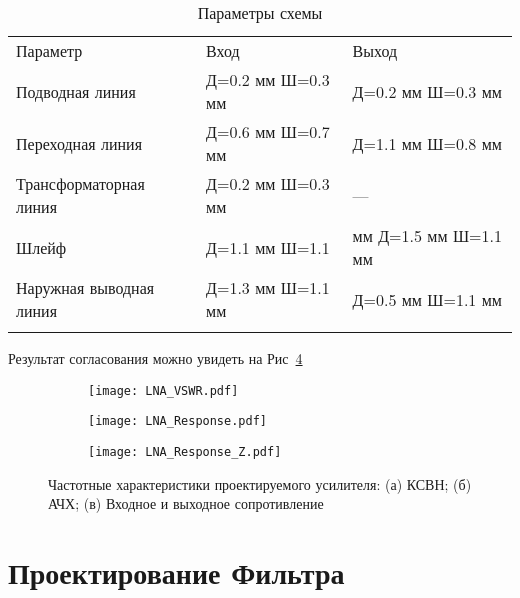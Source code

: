 \begin{table}[!ht]
	\renewcommand{\arraystretch}{2}
	\begin{center}
		\caption{Параметры схемы}\label{tab:LNA-Sch}
		\begin{tabularx}{0.9\textwidth}{!{\vrule width 2pt}*{3}{>{\centering\arraybackslash}X!{\vrule width 2pt}}}
			Параметр & Вход & Выход \\ 
			Подводная линия & Д=0.2 мм Ш=0.3 мм & Д=0.2 мм Ш=0.3 мм \\ \hline
			Переходная линия & Д=0.6 мм Ш=0.7 мм & Д=1.1 мм Ш=0.8 мм \\ \hline
			Трансформаторная линия & Д=0.2 мм Ш=0.3 мм & --- \\ \hline
			Шлейф & Д=1.1 мм Ш=1.1 & мм Д=1.5 мм Ш=1.1 мм \\ \hline
			Наружная выводная линия & Д=1.3 мм Ш=1.1 мм & Д=0.5 мм Ш=1.1 мм
			\\ 
		\end{tabularx}	
	\end{center}
\end{table}

Результат согласования можно увидеть на Рис~\ref{fig:LNA-data}

\begin{figure}[H]
	\captionsetup{singlelinecheck=off, justification=centering}
	\centering
	\begin{subfigure}[b]{0.45\textwidth}
		\centering
		\texttt{[image: LNA\_VSWR.pdf]}
		\caption{}%
		\label{fig:LNA_VSWR}
	\end{subfigure}
	\hfill
	\begin{subfigure}[b]{0.45\textwidth}
		\centering
		\texttt{[image: LNA\_Response.pdf]}
		\caption{}%
		\label{fig:LNA_Response}
	\end{subfigure}
	\hfill
\begin{subfigure}[b]{0.9\textwidth}
	\centering
	\texttt{[image: LNA\_Response\_Z.pdf]}
	\caption{}%
	\label{fig:LNA_Response_Z}
\end{subfigure}

	\caption{%
		Частотные характеристики проектируемого усилителя:
		(а) КСВН;
		(б) АЧХ;
		(в) Входное и выходное сопротивление
	}%
	\label{fig:LNA-data}
\end{figure}

\section{Проектирование Фильтра}

